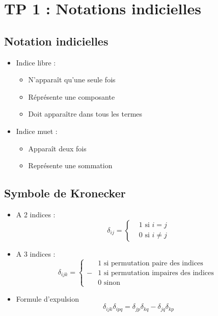 \section*{TP 1 : Notations indicielles}

\subsection*{Notation indicielles}
\begin{multicols}{2}
\begin{itemize}
	\item	Indice libre : 
		\begin{itemize}
			\item N'apparaît qu'une seule fois
			\item Réprésente une composante
			\item Doit apparaître dans tous les termes
		\end{itemize}
		
		\item Indice muet : 
			\begin{itemize}
				\item Apparaît deux fois
				\item Représente une sommation
			\end{itemize}
\end{itemize}
\end{multicols}

\subsection*{Symbole de Kronecker}
\begin{itemize}
	\item A 2 indices :
	\begin{equation}
	\delta _{ij} = 
	\left\{
	\begin{aligned}
	&1 \mbox{ si } i = j \\
	&0 \mbox{ si } i \neq j
	\end{aligned}
	\right.
	\end{equation}
	
	\item A 3 indices :
	\begin{equation}
	\delta _{ijk} = 
	\left\{
	\begin{aligned}
	&1 \mbox{ si permutation paire des indices}  \\
	-&1 \mbox{ si permutation impaires des indices } \\
	&0 \mbox{ sinon } 
	\end{aligned}
	\right.
	\end{equation}

	\item Formule d'expulsion 
		\begin{equation}
			\delta _{ijk} \delta _{ipq} = \delta _{jp} \delta _{kq} - \delta _{jq} \delta _{kp}
		\end{equation}
\end{itemize}

